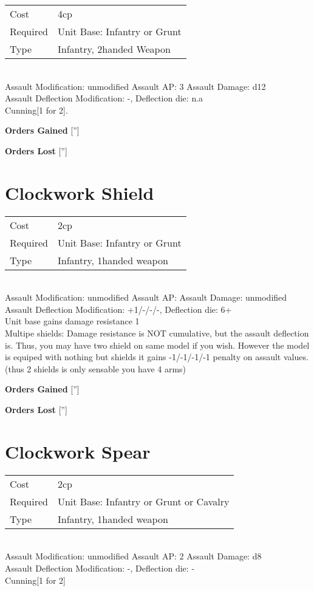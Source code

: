 \begin{tabular}{ll}
    Cost & 4cp \\
    Required & Unit Base: Infantry or Grunt\\
    Type & Infantry, 2handed Weapon\\
\end{tabular}
\ \\
Assault Modification: unmodified Assault AP: 3 Assault Damage: d12\\
Assault Deflection Modification: -, Deflection die: n.a \\
Cunning[1 for 2].



{\bf Orders Gained}
['']

{\bf Orders Lost}
['']
\section{ Clockwork Shield }

\begin{tabular}{ll}
    Cost & 2cp \\
    Required & Unit Base: Infantry or Grunt\\
    Type & Infantry, 1handed weapon\\
\end{tabular}
\ \\
Assault Modification: unmodified Assault AP:  Assault Damage: unmodified\\
Assault Deflection Modification: +1/-/-/-, Deflection die: 6+ \\


Unit base gains damage resistance 1\\ Multipe shields: Damage resistance is NOT cumulative, but the assault deflection is. Thus, you may have two shield on same model if you wish. However the model is equiped with nothing but shields it gains -1/-1/-1/-1 penalty on assault values. (thus 2 shields is only sensable you have 4 arms)

{\bf Orders Gained}
['']

{\bf Orders Lost}
['']
\section{ Clockwork Spear }

\begin{tabular}{ll}
    Cost & 2cp \\
    Required & Unit Base: Infantry or Grunt or Cavalry\\
    Type & Infantry, 1handed weapon\\
\end{tabular}
\ \\
Assault Modification: unmodified Assault AP: 2 Assault Damage: d8\\
Assault Deflection Modification: -, Deflection die: - \\
Cunning[1 for 2]



